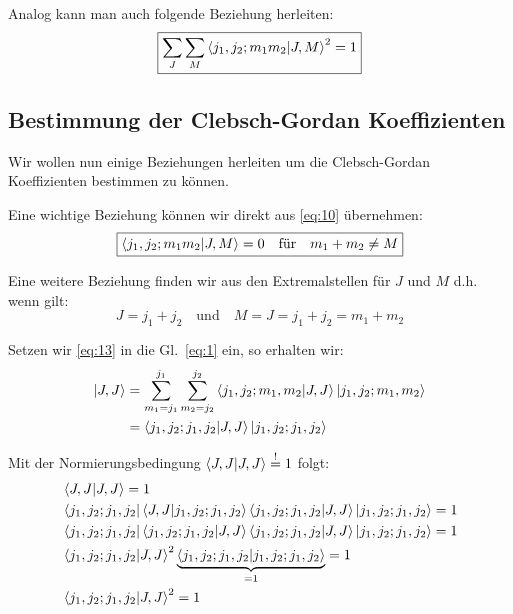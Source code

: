 Analog kann man auch folgende Beziehung herleiten:
\begin{equation}
  \label{eq:7}
  \boxed{\sum_{J}\sum_{M}\braket{j_1,j_2;m_1m_2}{J,M}^2=1}
\end{equation}

\subsection*{Bestimmung der Clebsch-Gordan Koeffizienten}
\label{sec:best-der-clebsch}

Wir wollen nun einige Beziehungen herleiten um die Clebsch-Gordan Koeffizienten
bestimmen zu können.

Eine wichtige Beziehung können wir direkt aus \eqref{eq:10} übernehmen:
\begin{equation}
  \label{eq:12}
  \boxed{\braket{j_1,j_2;m_1m_2}{J,M}=0 \quad \text{für} \quad m_1+m_2\neq M}
\end{equation}

Eine weitere Beziehung finden wir aus den Extremalstellen für \(J\) und \(M\)
d.h. wenn gilt:
\begin{equation}
  \label{eq:13}
  J=j_1+j_2 \quad \text{und} \quad M=J=j_1+j_2=m_1+m_2
\end{equation}

Setzen wir \eqref{eq:13} in die Gl.~\eqref{eq:1} ein, so erhalten wir:
\begin{align}
  \label{eq:14}
   \ket{J,J}&=\sum_{m_1=j_1}^{j_1}\sum_{m_2=j_2}^{j_2} 
   \braket{j_1,j_2;m_1,m_2}{J,J}
   \ket{j_1,j_2;m_1,m_2}\notag\\
   &= \braket{j_1,j_2;j_1,j_2}{J,J}
   \ket{j_1,j_2;j_1,j_2}
\end{align}

Mit der Normierungsbedingung \(\braket{J,J}{J,J}\stackrel{!}=1\) folgt:
\begin{align}
  \label{eq:15}
  &\braket{J,J}{J,J}=1\notag\\
  &\bra{j_1,j_2;j_1,j_2} \braket{J,J}{j_1,j_2;j_1,j_2}
  \braket{j_1,j_2;j_1,j_2}{J,J}\ket{j_1,j_2;j_1,j_2}=1\notag\\
  &\bra{j_1,j_2;j_1,j_2} \braket{j_1,j_2;j_1,j_2}{J,J}
  \braket{j_1,j_2;j_1,j_2}{J,J}\ket{j_1,j_2;j_1,j_2}=1\notag\\
  &\braket{j_1,j_2;j_1,j_2}{J,J}^2
  \underbrace{\braket{j_1,j_2;j_1,j_2}{j_1,j_2;j_1,j_2}}_{=1}=1\notag\\
  &\braket{j_1,j_2;j_1,j_2}{J,J}^2=1
\end{align}

